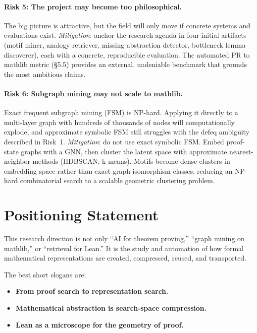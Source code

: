 \documentclass[12pt, a4paper]{article}
\begin{document}
\paragraph{Risk 5: The project may become too philosophical.}
The big picture is attractive, but the field will only move if concrete
systems and evaluations exist.
\textit{Mitigation}: anchor the research agenda in four initial artifacts
(motif miner, analogy retriever, missing abstraction detector, bottleneck
lemma discoverer), each with a concrete, reproducible evaluation. The
automated PR to mathlib metric (\S5.5) provides an external, undeniable
benchmark that grounds the most ambitious claims.

\paragraph{Risk 6: Subgraph mining may not scale to mathlib.}
Exact frequent subgraph mining (FSM) is NP-hard. Applying it directly to a
multi-layer graph with hundreds of thousands of nodes will computationally
explode, and approximate symbolic FSM still struggles with the defeq
ambiguity described in Risk~1.
\textit{Mitigation}: do not use exact symbolic FSM. Embed proof-state graphs
with a GNN, then cluster the latent space with approximate nearest-neighbor
methods (HDBSCAN, k-means). Motifs become dense clusters in embedding
space rather than exact graph isomorphism classes, reducing an NP-hard
combinatorial search to a scalable geometric clustering problem.

\section{Positioning Statement}

This research direction is not only ``AI for theorem proving,'' ``graph
mining on mathlib,'' or ``retrieval for Lean.'' It is the study and
automation of how formal mathematical representations are created,
compressed, reused, and transported.

The best short slogans are:
\begin{itemize}[leftmargin=1.5em]
  \item \textbf{From proof search to representation search.}
  \item \textbf{Mathematical abstraction is search-space compression.}
  \item \textbf{Lean as a microscope for the geometry of proof.}
\end{itemize}
\end{document}
